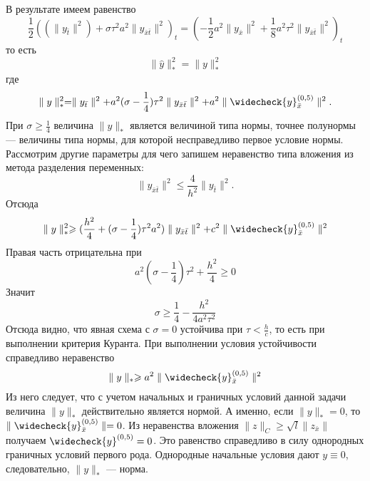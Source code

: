 \documentclass[12pt, a4paper]{article}
\newcommand{\down}[1]{\widecheck{#1}}
\begin{document}
	В результате имеем равенство
	\begin{equation*}
		\frac{1}{2}((\parallel y_{\bar{t}} \parallel^2) + \sigma \tau^2 a^2 \parallel y_{\bar{x}\bar{t}} \parallel^2)_t = (-\frac{1}{2} a^2 \parallel y_{\bar{x}} \parallel^2 + \frac{1}{8} a^2 \tau^2 \parallel y_{\bar{x}\bar{t}} \parallel^2)_t 
	\end{equation*}
	то есть
	\begin{equation*}
		\parallel \hat{y} \parallel^2_* = 	\parallel y \parallel^2_*
	\end{equation*}
	где 
	\begin{equation*}
		\parallel y \parallel^2_* = \parallel y_{\bar{t}} \parallel^2 + a^2(\sigma - \frac{1}{4}) \tau^2  \parallel y_{\bar{x}\bar{t}} \parallel^2 + a^2 \parallel \down{y}^{(0,5)}_{\bar{x}}\parallel^2.
	\end{equation*}
	При $\sigma\ge \frac{1}{4}$ величина $\parallel y \parallel_*$ является величиной типа нормы, точнее полунормы --- величины типа нормы, для которой несправедливо первое условие нормы. Рассмотрим другие параметры для чего запишем неравенство типа вложения из метода разделения переменных:
	\begin{equation*}
		\parallel y_{\bar{x}\bar{t}} \parallel^2 \le \frac{4}{h^2} \parallel y_{\bar{t}} \parallel^2.
	\end{equation*}
	Отсюда
	\begin{equation*}
		\parallel y \parallel^2_* \ge (\frac{h^2}{4} + (\sigma - \frac{1}{4}) \tau^2 a^2) \parallel y_{\bar{x}\bar{t}} \parallel^2 + c^2 \parallel \down{y}^{(0,5)}_{\bar{x}}\parallel^2
	\end{equation*}
	Правая часть отрицательна при
	\begin{equation*}
		a^2(\sigma - \frac{1}{4}) \tau^2 + \frac{h^2}{4} \ge 0
	\end{equation*}
	Значит
	\begin{equation*}
		\sigma \ge \frac{1}{4} - \frac{h^2}{4a^2 \tau^2}
	\end{equation*}
	Отсюда видно, что явная схема с $\sigma = 0$ устойчива при $\tau < \frac{h}{c}$, то есть при выполнении критерия Куранта. 
	При выполнении условия устойчивости справедливо неравенство
	\begin{equation*}
		\parallel y \parallel_* \ge a^2 \parallel \down{y}^{(0,5)}_{\bar{x}}\parallel^2
	\end{equation*}
	Из него следует, что с учетом начальных и граничных условий данной задачи величина $\parallel y \parallel_*$ действительно является нормой.  А именно, если $\parallel y \parallel_* = 0$, то $\parallel \down{y}^{(0,5)}_{\bar{x}}\parallel = 0$. Из неравенства вложения $\parallel z \parallel_C \ge \sqrt{l} \parallel z_{\bar{x}} \parallel$ получаем $\down{y}^{(0,5)} = 0$. Это равенство справедливо в силу однородных граничных условий первого рода. Однородные начальные условия дают $y \equiv 0$, следовательно,  $\parallel y \parallel_*$ --- норма.
	
\end{document}
